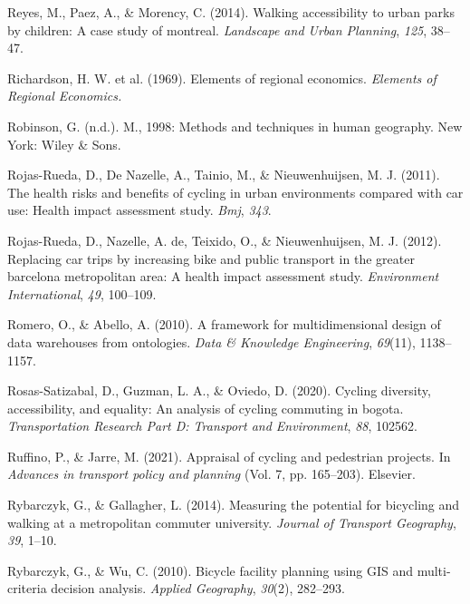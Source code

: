 \documentclass[
11pt, %
oneside, %
english, %
singlespacing, %
]{macthesis} %
\newlength{\cslhangindent}
\newenvironment{CSLReferences}[2] %
 {%
  \setlength{\parindent}{0pt}
  \ifodd #1 \everypar{\setlength{\hangindent}{\cslhangindent}}\ignorespaces\fi
  \ifnum #2 > 0
  \setlength{\parskip}{#2\baselineskip}
  \fi
 }%
 {}
\begin{document}
\begin{CSLReferences}{1}{0}
\leavevmode{}%
Reyes, M., Paez, A., \& Morency, C. (2014). Walking accessibility to urban parks by children: A case study of montreal. \emph{Landscape and Urban Planning}, \emph{125}, 38--47.

\leavevmode{}%
Richardson, H. W. et al. (1969). Elements of regional economics. \emph{Elements of Regional Economics.}

\leavevmode{}%
Robinson, G. (n.d.). M., 1998: Methods and techniques in human geography. New York: Wiley \& Sons.

\leavevmode{}%
Rojas-Rueda, D., De Nazelle, A., Tainio, M., \& Nieuwenhuijsen, M. J. (2011). The health risks and benefits of cycling in urban environments compared with car use: Health impact assessment study. \emph{Bmj}, \emph{343}.

\leavevmode{}%
Rojas-Rueda, D., Nazelle, A. de, Teixido, O., \& Nieuwenhuijsen, M. J. (2012). Replacing car trips by increasing bike and public transport in the greater barcelona metropolitan area: A health impact assessment study. \emph{Environment International}, \emph{49}, 100--109.

\leavevmode{}%
Romero, O., \& Abello, A. (2010). A framework for multidimensional design of data warehouses from ontologies. \emph{Data \& Knowledge Engineering}, \emph{69}(11), 1138--1157.

\leavevmode{}%
Rosas-Satizabal, D., Guzman, L. A., \& Oviedo, D. (2020). Cycling diversity, accessibility, and equality: An analysis of cycling commuting in bogota. \emph{Transportation Research Part D: Transport and Environment}, \emph{88}, 102562.

\leavevmode{}%
Ruffino, P., \& Jarre, M. (2021). Appraisal of cycling and pedestrian projects. In \emph{Advances in transport policy and planning} (Vol. 7, pp. 165--203). Elsevier.

\leavevmode{}%
Rybarczyk, G., \& Gallagher, L. (2014). Measuring the potential for bicycling and walking at a metropolitan commuter university. \emph{Journal of Transport Geography}, \emph{39}, 1--10.

\leavevmode{}%
Rybarczyk, G., \& Wu, C. (2010). Bicycle facility planning using GIS and multi-criteria decision analysis. \emph{Applied Geography}, \emph{30}(2), 282--293.


\end{CSLReferences}
\end{document}
